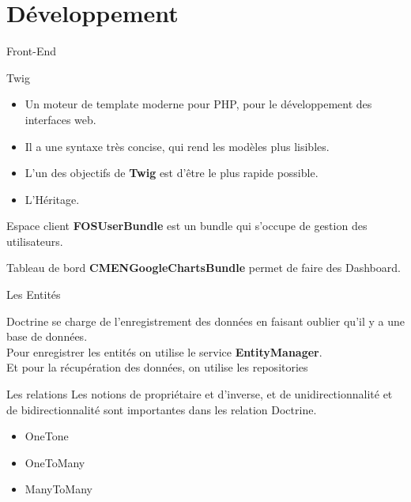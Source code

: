 \documentclass[french]{beamer}
\begin{document}
\section{Développement}
\begin{frame}{Front-End}
	\begin{block}{Twig}
	\begin{itemize}
	
\item	Un moteur de template moderne pour PHP, pour le développement des interfaces web.
	\item Il  a une syntaxe très concise, qui rend les modèles plus lisibles.
	\item L'un des objectifs de \textbf{Twig} est d'être le plus rapide possible.
	\item L'Héritage.
		\end{itemize}

	\end{block}
	\pause
\begin{block}{Espace client}
	\textbf{FOSUserBundle} est un bundle qui s'occupe de gestion des utilisateurs.
	\end{block}
	\pause
	\begin{block}{Tableau de bord}
	\textbf{CMENGoogleChartsBundle} permet de faire des Dashboard.
	\end{block}	
	
\end{frame}


\begin{frame}{Les Entités}
\begin{block}{Doctrine}
se charge de l'enregistrement des  données en  faisant oublier qu'il y a une base de données.\\
Pour enregistrer les entités on utilise le service \textbf{EntityManager}.\\
Et pour la récupération des données, on utilise les repositories
\end{block}
\pause
\begin{block}{Les relations}
Les notions de propriétaire et d'inverse, et de  unidirectionnalité et de bidirectionnalité sont  importantes dans les relation Doctrine.
\begin{itemize}
\item OneTone
\item OneToMany
\item ManyToMany

\end{itemize}
\end{block}

\end{frame}
\end{document}
